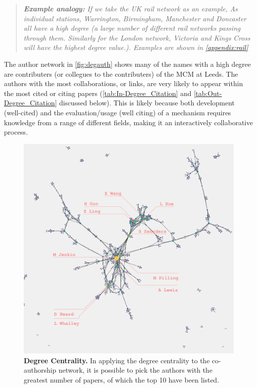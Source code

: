 \begin{quote}
\textit{
\textbf{Example analogy:} If we take the UK rail network as an example, As individual stations, Warrington, Birmingham, Manchester and Doncaster all have a high degree (a large number of different rail networks passing through them. Similarly for the London network, Victoria and Kings Cross will have the highest degree value.). Examples are shown in \autoref{appendix:rail}
}
\end{quote}

The author network in \autoref{fig:degauth} shows many of the names with a high degree are contributers (or collegues to the contributers) of the MCM at Leeds. The authors with the most collaborations, or links, are very likely to appear within the most cited or citing papers (\autoref{tab:In-Degree_Citation} and \autoref{tab:Out-Degree_Citation} discussed below). This is likely because both development (well-cited) and the evaluation/usage (well citing) of a mechanism requires knowledge from a range of different fields, making it an interactively collaborative process. 

\begin{figure}[H]
     \centering
         \includegraphics[width=.8\textwidth]{figures_c3/degreeauthor.png}
         
        \caption{ \textbf{Degree Centrality.} In applying the degree centrality to the co-authorship network, it is possible to pick the authors with the greatest number of papers, of which the top 10 have been listed.}
        \label{fig:degauth}
\end{figure}

